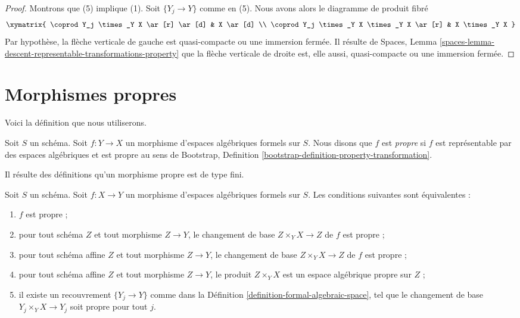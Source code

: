 \begin{proof}
\medskip\noindent
Montrons que (5) implique (1). Soit $\{Y_j \to Y\}$ comme en (5).
Nous avons alors le diagramme de produit fibré
$$
\xymatrix{
\coprod Y_j \times_Y X \ar[r] \ar[d] &
X \ar[d] \\
\coprod Y_j \times_Y X \times_Y X \ar[r] &
X \times_Y X
}
$$
Par hypothèse, la flèche verticale de gauche est quasi-compacte ou une immersion fermée.
Il résulte de
Spaces, Lemma \ref{spaces-lemma-descent-representable-transformations-property}
que la flèche verticale de droite est, elle aussi, quasi-compacte ou une
immersion fermée.
\end{proof}







\section{Morphismes propres}
\label{section-proper}

\noindent
Voici la définition que nous utiliserons.

\begin{definition}
\label{definition-proper}
Soit $S$ un schéma. Soit $f : Y \to X$ un morphisme d'espaces algébriques formels
sur $S$. Nous disons que $f$ est {\it propre}
si $f$ est représentable par des espaces algébriques et est propre au sens de
Bootstrap, Definition \ref{bootstrap-definition-property-transformation}.
\end{definition}

\noindent
Il résulte des définitions qu'un morphisme propre est de type fini.

\begin{lemma}
\label{lemma-proper-local}
Soit $S$ un schéma. Soit $f : X \to Y$ un morphisme d'espaces algébriques formels
sur $S$. Les conditions suivantes sont équivalentes :
\begin{enumerate}
\item $f$ est propre ;
\item pour tout schéma $Z$ et tout morphisme $Z \to Y$, le
changement de base $Z \times_Y X \to Z$ de $f$ est propre ;
\item pour tout schéma affine $Z$ et tout morphisme $Z \to Y$, le
changement de base $Z \times_Y X \to Z$ de $f$ est propre ;
\item pour tout schéma affine $Z$ et tout morphisme $Z \to Y$, le
produit $Z \times_Y X$ est un espace algébrique propre sur $Z$ ;
\item il existe un recouvrement $\{Y_j \to Y\}$ comme dans la
Définition \ref{definition-formal-algebraic-space},
tel que le changement de base $Y_j \times_Y X \to Y_j$ soit propre pour tout $j$.
\end{enumerate}
\end{lemma}

